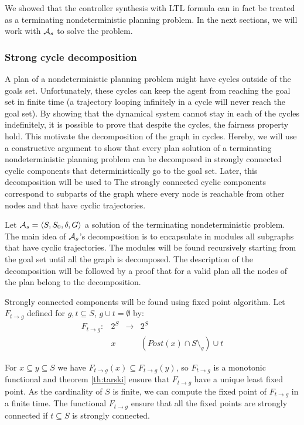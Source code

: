 We showed that the controller synthesis with LTL formula can in fact be treated as a terminating nondeterministic planning problem. In the next sections, we will work with $\mathcal{A}_s$ to solve the problem.

\subsubsection{Strong cycle decomposition}
A plan of a nondeterministic planning problem might have cycles outside of the goals set. Unfortunately, these cycles can keep the agent from reaching the goal set in finite time (a trajectory looping infinitely in a cycle will never reach the goal set).
By showing that the dynamical system cannot stay in each of the cycles indefinitely, it is possible to prove that despite the cycles, the fairness property hold.
This motivate the decomposition of the graph in cycles.
Hereby, we will use a constructive argument to show that every plan solution of a terminating nondeterministic planning problem can be decomposed in strongly connected cyclic components that deterministically go to the goal set. Later, this decomposition will be used to 
The strongly connected cyclic components correspond to subparts of the graph where every node is reachable from other nodes and that have cyclic trajectories.

Let $\Aterm = \systuple{S,S_0,\delta,G}$ a solution of the terminating nondeterministic problem.
The main idea of $\mathcal{A}_s$'s decomposition is to encapsulate in modules all subgraphs that have cyclic trajectories. The modules will be found recursively starting from the goal set until all the graph is decomposed.
The description of the decomposition will be followed by a proof that for a valid plan all the nodes of the plan belong to the decomposition.

Strongly connected components will be found using fixed point algorithm.
Let $F_{t \rightarrow g}$ defined for $g,t \subseteq S$, $g \cup t = \emptyset$ by:
\begin{equation}
\begin{array}{llll}
F_{t \rightarrow g} :& 2^S & \rightarrow & 2^S\\
 & x &  & (Post(x) \cap S \setminus_g) \cup t
\end{array}
\end{equation}

For $x \subseteq y \subseteq S$ we have $F_{t \rightarrow g} (x) \subseteq F_{t \rightarrow g}(y)$, so $F_{t \rightarrow g}$ is a monotonic functional and theorem \ref{th:tarski} ensure that $F_{t \rightarrow g}$ have a unique least fixed point.
As the cardinality of $S$ is finite, we can compute the fixed point of $F_{t \rightarrow g}$ in a finite time.
The functional $F_{t \rightarrow g}$ ensure that all the fixed points are strongly connected if $t \subseteq S$ is strongly connected.

